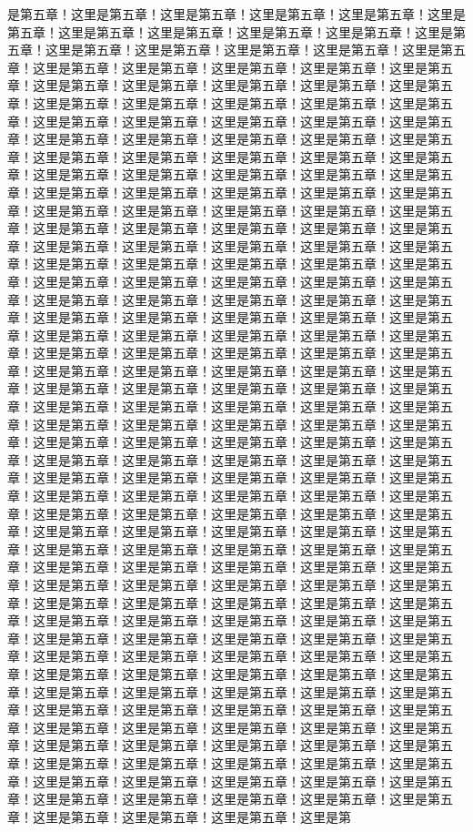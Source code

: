 是第五章！这里是第五章！这里是第五章！这里是第五章！这里是第五章！这里是第五章！这里是第五章！这里是第五章！这里是第五章！这里是第五章！这里是第五章！这里是第五章！这里是第五章！这里是第五章！这里是第五章！这里是第五章！这里是第五章！这里是第五章！这里是第五章！这里是第五章！这里是第五章！这里是第五章！这里是第五章！这里是第五章！这里是第五章！这里是第五章！这里是第五章！这里是第五章！这里是第五章！这里是第五章！这里是第五章！这里是第五章！这里是第五章！这里是第五章！这里是第五章！这里是第五章！这里是第五章！这里是第五章！这里是第五章！这里是第五章！这里是第五章！这里是第五章！这里是第五章！这里是第五章！这里是第五章！这里是第五章！这里是第五章！这里是第五章！这里是第五章！这里是第五章！这里是第五章！这里是第五章！这里是第五章！这里是第五章！这里是第五章！这里是第五章！这里是第五章！这里是第五章！这里是第五章！这里是第五章！这里是第五章！这里是第五章！这里是第五章！这里是第五章！这里是第五章！这里是第五章！这里是第五章！这里是第五章！这里是第五章！这里是第五章！这里是第五章！这里是第五章！这里是第五章！这里是第五章！这里是第五章！这里是第五章！这里是第五章！这里是第五章！这里是第五章！这里是第五章！这里是第五章！这里是第五章！这里是第五章！这里是第五章！这里是第五章！这里是第五章！这里是第五章！这里是第五章！这里是第五章！这里是第五章！这里是第五章！这里是第五章！这里是第五章！这里是第五章！这里是第五章！这里是第五章！这里是第五章！这里是第五章！这里是第五章！这里是第五章！这里是第五章！这里是第五章！这里是第五章！这里是第五章！这里是第五章！这里是第五章！这里是第五章！这里是第五章！这里是第五章！这里是第五章！这里是第五章！这里是第五章！这里是第五章！这里是第五章！这里是第五章！这里是第五章！这里是第五章！这里是第五章！这里是第五章！这里是第五章！这里是第五章！这里是第五章！这里是第五章！这里是第五章！这里是第五章！这里是第五章！这里是第五章！这里是第五章！这里是第五章！这里是第五章！这里是第五章！这里是第五章！这里是第五章！这里是第五章！这里是第五章！这里是第五章！这里是第五章！这里是第五章！这里是第五章！这里是第五章！这里是第五章！这里是第五章！这里是第五章！这里是第五章！这里是第五章！这里是第五章！这里是第五章！这里是第五章！这里是第五章！这里是第五章！这里是第五章！这里是第五章！这里是第五章！这里是第五章！这里是第五章！这里是第五章！这里是第五章！这里是第五章！这里是第五章！这里是第五章！这里是第五章！这里是第五章！这里是第五章！这里是第五章！这里是第五章！这里是第五章！这里是第五章！这里是第五章！这里是第五章！这里是第五章！这里是第五章！这里是第五章！这里是第五章！这里是第五章！这里是第五章！这里是第五章！这里是第五章！这里是第五章！这里是第五章！这里是第五章！这里是第五章！这里是第五章！这里是第五章！这里是第五章！这里是第五章！这里是第五章！这里是第五章！这里是第五章！这里是第五章！这里是第五章！这里是第五章！这里是第五章！这里是第五章！这里是第五章！这里是第五章！这里是第五章！这里是第五章！这里是第五章！这里是第五章！这里是第五章！这里是第五章！这里是第五章！这里是第五章！这里是第五章！这里是第五章！这里是第五章！这里是第五章！这里是第五章！这里是第五章！这里是第五章！这里是第五章！这里是第五章！这里是第五章！这里是第五章！这里是第五章！这里是第五章！这里是第五章！这里是第五章！这里是第五章！这里是第五章！这里是第五章！这里是第五章！这里是第五章！这里是第五章！这里是第五章！这里是第五章！这里是第五章！这里是第五章！这里是第五章！这里是第